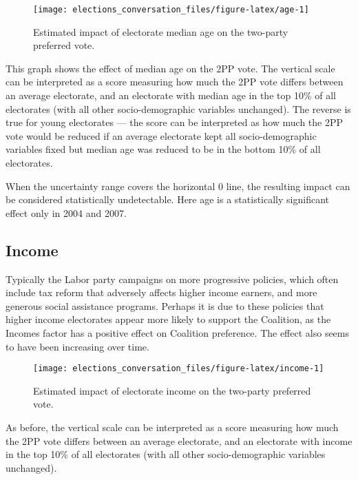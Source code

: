 \documentclass[11pt,a4paper,]{article}
\begin{document}
\begin{figure}[H]

{\centering \texttt{[image: elections\_conversation\_files/figure-latex/age-1]} 

}

\caption{Estimated impact of electorate median age on the two-party preferred vote.}\label{fig:age}
\end{figure}

This graph shows the effect of median age on the 2PP vote. The vertical scale can be interpreted as a score measuring how much the 2PP vote differs between an average electorate, and an electorate with median age in the top 10\% of all electorates (with all other socio-demographic variables unchanged). The reverse is true for young electorates --- the score can be interpreted as how much the 2PP vote would be reduced if an average electorate kept all socio-demographic variables fixed but median age was reduced to be in the bottom 10\% of all electorates.

When the uncertainty range covers the horizontal 0 line, the resulting impact can be considered statistically undetectable. Here age is a statistically significant effect only in 2004 and 2007.

\hypertarget{income}{%
\subsection*{Income}\label{income}}

Typically the Labor party campaigns on more progressive policies, which often include tax reform that adversely affects higher income earners, and more generous social assistance programs. Perhaps it is due to these policies that higher income electorates appear more likely to support the Coalition, as the Incomes factor has a positive effect on Coalition preference. The effect also seems to have been increasing over time.

\begin{figure}[H]

{\centering \texttt{[image: elections\_conversation\_files/figure-latex/income-1]} 

}

\caption{Estimated impact of electorate income on the two-party preferred vote.}\label{fig:income}
\end{figure}

As before, the vertical scale can be interpreted as a score measuring how much the 2PP vote differs between an average electorate, and an electorate with income in the top 10\% of all electorates (with all other socio-demographic variables unchanged).
\end{document}
